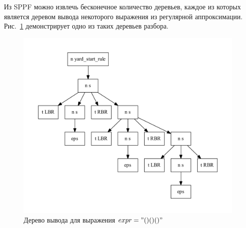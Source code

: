 
Из SPPF можно извлечь бесконечное количество деревьев, каждое из которых является деревом вывода некоторого выражения из регулярной аппроксимации. Рис.~\ref{sppf3} демонстрирует одно из таких деревьев разбора. 

\begin{figure}[H]
 \centering
 \includegraphics[width=\textwidth]{Verbitskaya/pics/sppf3.pdf}
 \caption{Дерево вывода для выражения $expr="()()()"$}
 \label{sppf3}
\end{figure}
